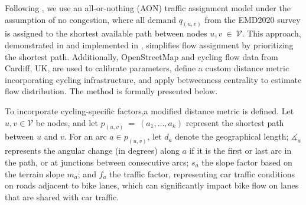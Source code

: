\documentclass[letterpaper, 10 pt, conference]{ieeeconf}  %
\begin{document}

Following \cite{mesbah2012bilevel}, we use an all-or-nothing (AON) traffic assignment model under the assumption of no congestion, where all demand $q_{(u,v)}$ from the EMD2020 survey \cite{SMMAG_EMD} is assigned to the shortest available path between nodes $u,v~\in~\mathcal{V}$. This approach, demonstrated in \cite{mesbah2012bilevel} and implemented in \cite{cooper2017using}, simplifies flow assignment by prioritizing the shortest path. Additionally, OpenStreetMap and cycling flow data from Cardiff, UK, are used to calibrate parameters, define a custom distance metric incorporating cycling infrastructure, and apply betweenness centrality to estimate flow distribution. The method is formally presented below.



To incorporate cycling-specific factors,a modified distance metric is defined. Let $u, v \in \mathcal{V}$ be nodes, and let $p_{(u,v)}~=~(a_{1}, \ldots, a_{k})$ represent the shortest path between $u$ and $v$. For an arc $a \in p_{(u,v)}$, let $d_{a}$ denote the geographical length; $\measuredangle_{a}$ represents the angular change (in degrees) along $a$ if it is the first or last arc in the path, or at junctions between consecutive arcs; $s_{a}$ the slope factor based on the terrain slope $m_{a}$; and $f_{a}$ the traffic factor, representing car traffic conditions on roads adjacent to bike lanes, which can significantly impact bike flow on lanes that are shared with car traffic.
\end{document}
